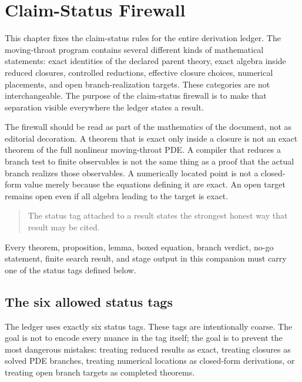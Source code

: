 \chapter{Claim-Status Firewall}
\label{chap:claim-status-firewall}

This chapter fixes the claim-status rules for the entire derivation ledger.  The moving-throat program contains several different kinds of mathematical statements: exact identities of the declared parent theory, exact algebra inside reduced closures, controlled reductions, effective closure choices, numerical placements, and open branch-realization targets.  These categories are not interchangeable.  The purpose of the claim-status firewall is to make that separation visible everywhere the ledger states a result.

The firewall should be read as part of the mathematics of the document, not as editorial decoration.  A theorem that is exact only inside a closure is not an exact theorem of the full nonlinear moving-throat PDE.  A compiler that reduces a branch test to finite observables is not the same thing as a proof that the actual branch realizes those observables.  A numerically located point is not a closed-form value merely because the equations defining it are exact.  An open target remains open even if all algebra leading to the target is exact.

\begin{quote}
The status tag attached to a result states the strongest honest way that result may be cited.
\end{quote}

Every theorem, proposition, lemma, boxed equation, branch verdict, no-go statement, finite search result, and stage output in this companion must carry one of the status tags defined below.

\section{The six allowed status tags}
\label{sec:six-status-tags}

The ledger uses exactly six status tags.  These tags are intentionally coarse.  The goal is not to encode every nuance in the tag itself; the goal is to prevent the most dangerous mistakes: treating reduced results as exact, treating closures as solved PDE branches, treating numerical locations as closed-form derivations, or treating open branch targets as completed theorems.

